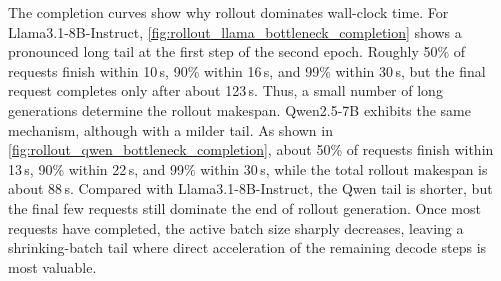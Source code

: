 The completion curves show why rollout dominates wall-clock time.
For Llama3.1-8B-Instruct, \cref{fig:rollout_llama_bottleneck_completion} shows a pronounced long tail at the first step of the second epoch.
Roughly 50\% of requests finish within 10\,s, 90\% within 16\,s, and 99\% within 30\,s, but the final request completes only after about 123\,s.
Thus, a small number of long generations determine the rollout makespan.
Qwen2.5-7B exhibits the same mechanism, although with a milder tail.
As shown in \cref{fig:rollout_qwen_bottleneck_completion}, about 50\% of requests finish within 13\,s, 90\% within 22\,s, and 99\% within 30\,s, while the total rollout makespan is about 88\,s.
Compared with Llama3.1-8B-Instruct, the Qwen tail is shorter, but the final few requests still dominate the end of rollout generation.
Once most requests have completed, the active batch size sharply decreases, leaving a shrinking-batch tail where direct acceleration of the remaining decode steps is most valuable.


